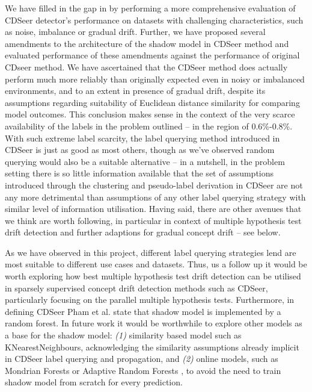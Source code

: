\documentclass{svproc}
\begin{document}
We have filled in the gap in \cite{pham2025} by performing a more comprehensive evaluation of CDSeer detector's performance on datasets with challenging characteristics, such as noise, imbalance or gradual drift. Further, we have proposed several amendments to the architecture of the shadow model in CDSeer method and evaluated performance of these amendments against the performance of original CDseer method. We have ascertained that the CDSeer method \cite{pham2025}  does actually perform much more reliably than originally expected even in noisy or imbalanced environments, and to an extent in presence of gradual drift, despite its assumptions regarding suitability of Euclidean distance similarity for comparing model outcomes. This conclusion makes sense in the context of the very scarce availability of the labels in the problem outlined – in the region of 0.6\%-0.8\%. With such extreme label scarcity, the label querying method introduced in CDSeer is just as good as most others, though as we’ve observed random querying would also be a suitable alternative – in a nutshell, in the problem setting there is so little information available that the set of assumptions introduced through the clustering and pseudo-label derivation in CDSeer are not any more detrimental than assumptions of any other label querying strategy with similar level of information utilisation. Having said, there are other avenues that we think are worth following, in particular in context of multiple hypothesis test drift detection  and further adaptions for gradual concept drift – see below. 

As we have observed in this project, different label querying strategies lend are most suitable to different use cases and datasets. Thus, us a follow up it would be worth exploring how best multiple hypothesis test drift detection \cite{lu2018} can be utilised in sparsely supervised concept drift detection methods such as CDSeer, particularly focusing on the parallel multiple hypothesis tests. Furthermore, in defining CDSeer Pham et al. \cite{pham2025} state that shadow model is implemented by a random forest. In future work it would be worthwhile to explore other models as a base for the shadow model: \textit{(1)} similarity based model such as KNearestNeighbours, acknowledging the similarity assumptions already implicit in CDSeer label querying and propagation, and \textit{(2)} online models, such as Mondrian Forests \cite{lakshminarayanan2014} or Adaptive Random Forests \cite{gomes2017}, to avoid the need to train shadow model from scratch for every prediction.
\end{document}
